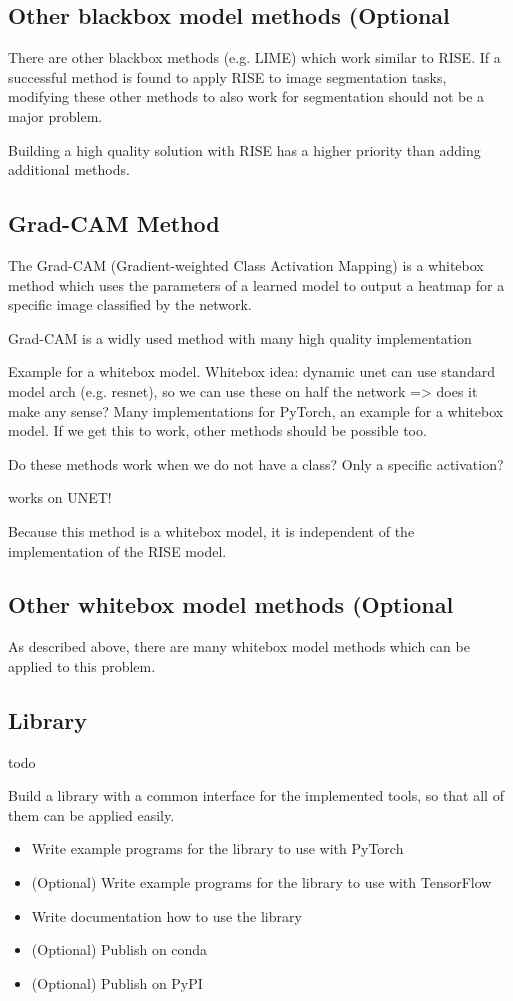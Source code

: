 \subsection{Other blackbox model methods (Optional}
There are other blackbox methods (e.g. LIME\cite{ribeiro2016should}) which work similar to RISE. If a successful method is found to apply RISE to image segmentation tasks, modifying these other methods to also work for segmentation should not be a major problem.

Building a high quality solution with RISE has a higher priority than adding additional methods.

\subsection{Grad-CAM Method}
The Grad-CAM (Gradient-weighted Class Activation Mapping) is a whitebox method which uses the parameters of a learned model to output a heatmap for a specific image classified by the network.

Grad-CAM is a widly used method with many high quality implementation



Example for a whitebox model. Whitebox idea: dynamic unet can use standard model arch (e.g. resnet), so we can use these on half the network => does it make any sense?
Many implementations for PyTorch, an example for a whitebox model. If we get this to work, other methods should be possible too.

Do these methods work when we do not have a class? Only a specific activation?

works on UNET!

Because this method is a whitebox model, it is independent of the implementation of the RISE model.


\subsection{Other whitebox model methods (Optional}
As described above, there are many whitebox model methods which can be applied to this problem.

\subsection{Library}
todo

Build a library with a common interface for the implemented tools, so that all of them can be applied easily.
\begin{itemize}
    \item Write example programs for the library to use with PyTorch
    \item (Optional) Write example programs for the library to use with TensorFlow
    \item Write documentation how to use the library
    \item (Optional) Publish on conda
    \item (Optional) Publish on PyPI
    
\end{itemize}

